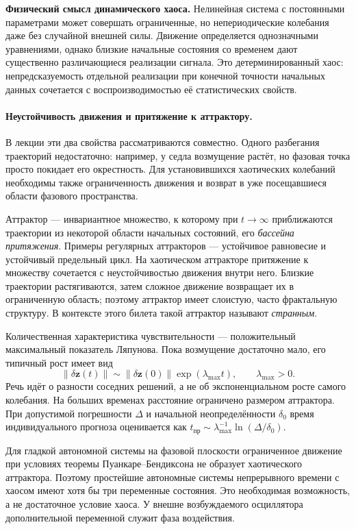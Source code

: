 \textbf{Физический смысл динамического хаоса.} Нелинейная система с постоянными параметрами может совершать ограниченные, но непериодические колебания даже без случайной внешней силы. Движение определяется однозначными уравнениями, однако близкие начальные состояния со временем дают существенно различающиеся реализации сигнала. Это детерминированный хаос: непредсказуемость отдельной реализации при конечной точности начальных данных сочетается с воспроизводимостью её статистических свойств.

\paragraph{Неустойчивость движения и притяжение к аттрактору.}
В лекции эти два свойства рассматриваются совместно. Одного разбегания траекторий недостаточно: например, у седла возмущение растёт, но фазовая точка просто покидает его окрестность. Для установившихся хаотических колебаний необходимы также ограниченность движения и возврат в уже посещавшиеся области фазового пространства.

Аттрактор --- инвариантное множество, к которому при $t\to\infty$ приближаются траектории из некоторой области начальных состояний, его \emph{бассейна притяжения}. Примеры регулярных аттракторов --- устойчивое равновесие и устойчивый предельный цикл. На хаотическом аттракторе притяжение к множеству сочетается с неустойчивостью движения внутри него. Близкие траектории растягиваются, затем сложное движение возвращает их в ограниченную область; поэтому аттрактор имеет слоистую, часто фрактальную структуру. В контексте этого билета такой аттрактор называют \emph{странным}.

Количественная характеристика чувствительности --- положительный максимальный показатель Ляпунова. Пока возмущение достаточно мало, его типичный рост имеет вид
\begin{equation}
 \|\delta\bm z(t)\|\sim\|\delta\bm z(0)\|\exp(\lambda_{\max}t),\qquad \lambda_{\max}>0.
\end{equation}
Речь идёт о разности соседних решений, а не об экспоненциальном росте самого колебания. На больших временах расстояние ограничено размером аттрактора. При допустимой погрешности $\Delta$ и начальной неопределённости $\delta_0$ время индивидуального прогноза оценивается как $t_{\mathrm{пр}}\sim\lambda_{\max}^{-1}\ln(\Delta/\delta_0)$.

Для гладкой автономной системы на фазовой плоскости ограниченное движение при условиях теоремы Пуанкаре--Бендиксона не образует хаотического аттрактора. Поэтому простейшие автономные системы непрерывного времени с хаосом имеют хотя бы три переменные состояния. Это необходимая возможность, а не достаточное условие хаоса. У внешне возбуждаемого осциллятора дополнительной переменной служит фаза воздействия.

